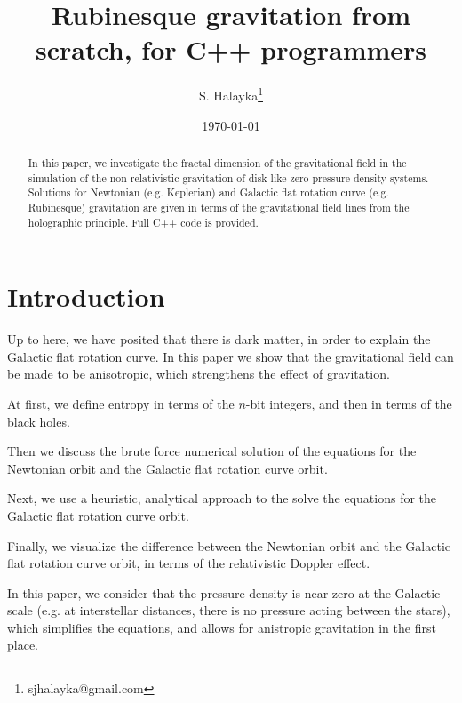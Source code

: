 \documentclass[12pt]{article}
\title{Rubinesque gravitation from scratch, for C++ programmers}
\author{S. Halayka\footnote{sjhalayka@gmail.com}}
\date{\today\;\currenttime}
\begin{document}
 
\maketitle

\begin{abstract}

In this paper, we investigate the fractal dimension of the gravitational field in the simulation of the non-relativistic gravitation of disk-like zero pressure density systems.
Solutions for Newtonian (e.g. Keplerian) and Galactic flat rotation curve (e.g. Rubinesque) gravitation are given in terms of the gravitational field lines from the holographic principle.
Full C++ code is provided.
\end{abstract}



\section{Introduction}

Up to here, we have posited that there is dark matter, in order to explain the Galactic flat rotation curve.
In this paper we show that the gravitational field can be made to be anisotropic, which strengthens the effect of gravitation.

At first, we define entropy in terms of the $n$-bit integers, and then in terms of the black holes.

Then we discuss the brute force numerical solution of the equations for the Newtonian orbit and the Galactic flat rotation curve orbit.

Next, we use a heuristic, analytical approach to the solve the equations for the Galactic flat rotation curve orbit.

Finally, we visualize the difference between the Newtonian orbit and the Galactic flat rotation curve orbit, in terms of the relativistic Doppler effect.

In this paper, we consider that the pressure density is near zero at the Galactic scale (e.g. at interstellar distances, there is no pressure acting between the stars), which simplifies the equations, and allows for anistropic gravitation in the first place.
\end{document}
